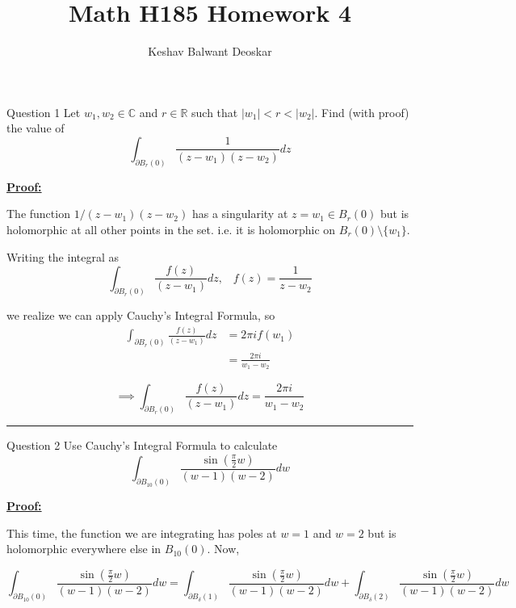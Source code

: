\documentclass{article}
\title{Math H185 Homework 4}
\author{Keshav Balwant Deoskar}
\newcommand{\R}{\mathbb{R}}
\newcommand{\C}{\mathbb{C}}
\begin{document}
\maketitle



\begin{mathdefinitionbox}{Question 1}
\vskip 0.5cm
Let $w_1, w_2 \in \C$ and $r \in \R$ such that $\left|w_1\right| < r < \left|w_2\right|$. Find (with proof) the value of 
\[ \int_{\partial B_r(0)} \frac{1}{(z-w_1)(z-w_2)} dz \]
\end{mathdefinitionbox}

\vskip 0.5cm
\underline{\textbf{Proof:}}

The function $1/(z-w_1)(z-w_2)$ has a singularity at $z = w_1 \in B_r(0)$ but is holomorphic at all other points in the set. i.e. it is holomorphic on $B_r(0) \setminus \{w_1\}$. 

\vskip 0.5cm
Writing the integral as 
\[ \int_{\partial B_r(0)} \frac{f(z)}{(z-w_1)} dz, \;\;\; f(z) = \frac{1}{z-w_2} \]

we realize we can apply Cauchy's Integral Formula, so 
\begin{align}
  \int_{\partial B_r(0)} \frac{f(z)}{(z-w_1)} dz &= 2\pi i f(w_1) \\
  &= \frac{2\pi i }{w_1 - w_2}
\end{align}

\[ \implies \boxed{\int_{\partial B_r(0)} \frac{f(z)}{(z-w_1)} dz = \frac{2\pi i }{w_1 - w_2}}  \]

\vskip 0.5cm
\hrule 
\vskip 0.5cm

\begin{mathdefinitionbox}{Question 2}
\vskip 0.5cm
Use Cauchy's Integral Formula to calculate 
\[ \int_{\partial B_{10}(0)}  \frac{\sin\left( \frac{\pi}{2} w \right)}{(w-1)(w-2)} dw \]
\end{mathdefinitionbox}

\vskip 0.5cm
\underline{\textbf{Proof:}}

This time, the function we are integrating has poles at $w = 1$ and $w = 2$ but is holomorphic everywhere else in $B_10(0)$. Now, 

\[ \int_{\partial B_{10}(0)}  \frac{\sin\left( \frac{\pi}{2} w \right)}{(w-1)(w-2)} dw = \int_{\partial B_{\delta}(1)}  \frac{\sin\left( \frac{\pi}{2} w \right)}{(w-1)(w-2)} dw + \int_{\partial B_{\delta}(2)}  \frac{\sin\left( \frac{\pi}{2} w \right)}{(w-1)(w-2)} dw  \]
\end{document}
